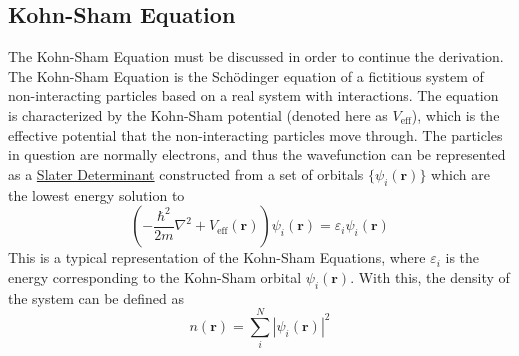 \documentclass[12pt]{article}
\newcommand{\lrp}[1]{\left( #1 \right)}
\begin{document}
\subsection{Kohn-Sham Equation} %
The Kohn-Sham Equation \cite{KSeq} must be discussed in order to continue the derivation. The Kohn-Sham Equation is the Sch\"odinger equation of a fictitious system of non-interacting particles based on a real system with interactions. The equation is characterized by the Kohn-Sham potential (denoted here as $V_{\mathrm{eff}}$), which is the effective potential that the non-interacting particles move through. The particles in question are normally electrons, and thus the wavefunction can be represented as a \href{https://en.wikipedia.org/wiki/Slater_determinant}{Slater Determinant} constructed from a set of orbitals $\{\psi_i(\textbf{r})\}$ which are the lowest energy solution to 
\begin{equation}\label{eq:KSeq}
    \lrp{-\frac{\hbar^2}{2m}\nabla^2+ V_{\mathrm{eff}}(\textbf{r})}\psi_i(\textbf{r}) = \varepsilon_i\psi_i(\textbf{r})
\end{equation}
This is a typical representation of the Kohn-Sham Equations, where $\varepsilon_i$ is the energy corresponding to the Kohn-Sham orbital $\psi_i(\textbf{r})$. With this, the density of the system can be defined as 
\begin{equation*}
    n(\textbf{r}) = \sum_i^N |\psi_i(\textbf{r})|^2
\end{equation*}
\end{document}
